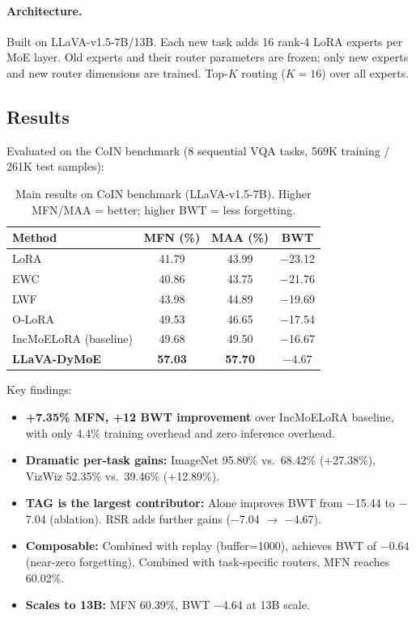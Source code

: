 \documentclass[11pt]{article}
\begin{document}
\paragraph{Architecture.}
Built on LLaVA-v1.5-7B/13B. Each new task adds 16 rank-4 LoRA experts per MoE layer. Old experts and their router parameters are frozen; only new experts and new router dimensions are trained. Top-$K$ routing ($K=16$) over all experts.

\subsection{Results}

Evaluated on the CoIN benchmark (8 sequential VQA tasks, 569K training / 261K test samples):

\begin{table}[h]
\centering
\caption{Main results on CoIN benchmark (LLaVA-v1.5-7B). Higher MFN/MAA = better; higher BWT = less forgetting.}
\begin{tabular}{lccc}
\toprule
\textbf{Method} & \textbf{MFN (\%)} & \textbf{MAA (\%)} & \textbf{BWT} \\
\midrule
LoRA & 41.79 & 43.99 & $-$23.12 \\
EWC & 40.86 & 43.75 & $-$21.76 \\
LWF & 43.98 & 44.89 & $-$19.69 \\
O-LoRA & 49.53 & 46.65 & $-$17.54 \\
IncMoELoRA (baseline) & 49.68 & 49.50 & $-$16.67 \\
\textbf{LLaVA-DyMoE} & \textbf{57.03} & \textbf{57.70} & $\mathbf{-4.67}$ \\
\bottomrule
\end{tabular}
\end{table}

Key findings:
\begin{itemize}
    \item \textbf{+7.35\% MFN, +12 BWT improvement} over IncMoELoRA baseline, with only 4.4\% training overhead and zero inference overhead.
    \item \textbf{Dramatic per-task gains:} ImageNet 95.80\% vs.\ 68.42\% (+27.38\%), VizWiz 52.35\% vs.\ 39.46\% (+12.89\%).
    \item \textbf{TAG is the largest contributor:} Alone improves BWT from $-$15.44 to $-$7.04 (ablation). RSR adds further gains ($-$7.04 $\to$ $-$4.67).
    \item \textbf{Composable:} Combined with replay (buffer=1000), achieves BWT of $-$0.64 (near-zero forgetting). Combined with task-specific routers, MFN reaches 60.02\%.
    \item \textbf{Scales to 13B:} MFN 60.39\%, BWT $-$4.64 at 13B scale.
\end{itemize}
\end{document}
